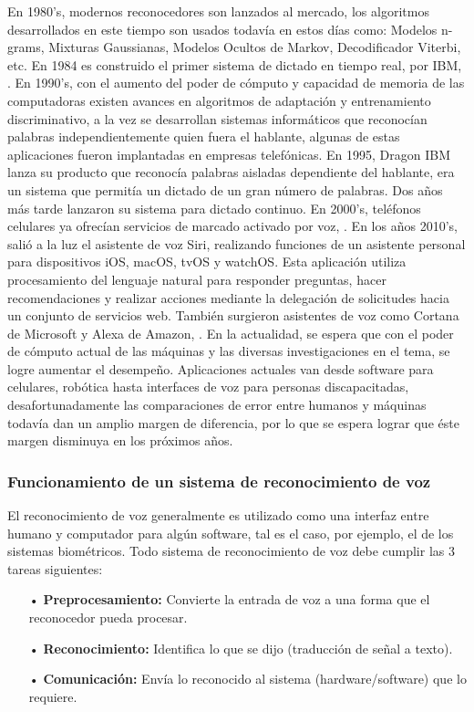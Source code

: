 \vskip 0.5cm
En 1980’s, modernos reconocedores son lanzados al mercado, los algoritmos desarrollados en este tiempo son usados todavía en estos días como: Modelos n-grams, Mixturas Gaussianas, Modelos Ocultos de Markov, Decodificador Viterbi, etc. En 1984 es construido el primer sistema de dictado en tiempo real, por IBM, \citep{orlando}.
\vskip 0.5cm
En 1990’s, con el aumento del poder de cómputo y capacidad de memoria de las computadoras existen avances en algoritmos de adaptación y entrenamiento discriminativo, a la vez se desarrollan sistemas informáticos que reconocían palabras independientemente quien fuera el hablante, algunas de estas aplicaciones fueron implantadas en empresas telefónicas. En 1995, Dragon IBM lanza su producto que reconocía palabras aisladas dependiente del hablante, era un sistema que permitía un dictado de un gran número de palabras. Dos años más tarde lanzaron su sistema para dictado continuo. En 2000’s, teléfonos celulares ya ofrecían servicios de marcado activado por voz, \citep{orlando}.
\vskip 0.5cm
En los años 2010’s, salió a la luz el asistente de voz Siri, realizando funciones de un asistente personal para dispositivos iOS, macOS, tvOS y watchOS. Esta aplicación utiliza procesamiento del lenguaje natural para responder preguntas, hacer recomendaciones y realizar acciones mediante la delegación de solicitudes hacia un conjunto de servicios web. También surgieron asistentes de voz como Cortana de Microsoft y Alexa de Amazon, \citep{timetoast2010}.
\vskip 0.5cm
En la actualidad, se espera que con el poder de cómputo actual de las máquinas y las diversas investigaciones en el tema, se logre aumentar el desempeño. Aplicaciones actuales van desde software para celulares, robótica hasta interfaces de voz para personas discapacitadas, desafortunadamente las comparaciones de error entre humanos y máquinas todavía dan un amplio margen de diferencia, por lo que se espera lograr que éste margen disminuya en los próximos años.

\subsubsection{Funcionamiento de un sistema de reconocimiento de voz}
El reconocimiento de voz generalmente es utilizado como una interfaz entre humano y computador para algún software, tal es el caso, por ejemplo, el de los sistemas biométricos. Todo sistema de reconocimiento de voz debe cumplir las 3 tareas siguientes:

\begin{enumerate}
\item[•]\textbf{Preprocesamiento:} Convierte la entrada de voz a una forma que el reconocedor pueda procesar.
\item[•]\textbf{Reconocimiento:} Identifica lo que se dijo (traducción de señal a texto).
\item[•]\textbf{Comunicación:} Envía lo reconocido al sistema (hardware/software) que lo requiere.
\end{enumerate}

